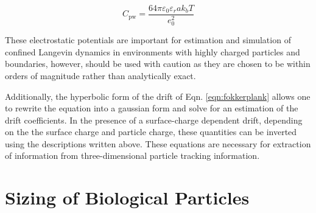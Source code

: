 \begin{equation}\label{eqn:amp2}
    C_\mathrm{pw} = \frac{64 \pi \varepsilon_0 \varepsilon_r a k_b T}{e_0^2}
\end{equation}

These electrostatic potentials are important for estimation and simulation of confined Langevin dynamics in environments with highly charged particles and boundaries, however, should be used with caution as they are chosen to be within orders of magnitude rather than analytically exact. 

Additionally, the hyperbolic form of the drift of Eqn. \ref{eqn:fokkerplank} allows one to rewrite the equation into a gaussian form and solve for an estimation of the drift coefficients. In the presence of a surface-charge dependent drift, depending on the the surface charge and particle charge, these quantities can be inverted using the descriptions written above. These equations are necessary for extraction of information from three-dimensional particle tracking information.  






\chapter{Sizing of Biological Particles}
\label{chap:bioapp}

